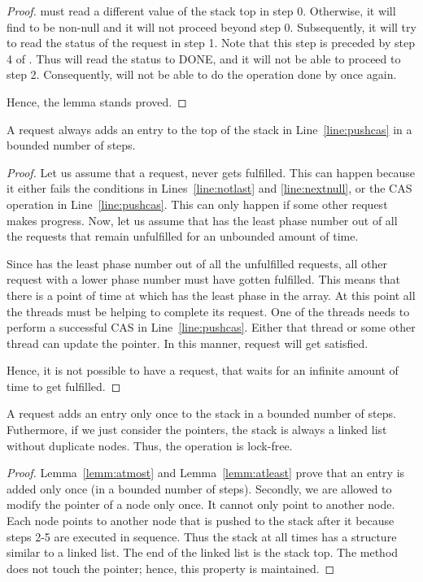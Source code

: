 \documentclass{llncs}
\newcommand{\DONE}{{\scriptsize{DONE}}\xspace}
\begin{document}
\begin{appendix}
\begin{proof}
 must read a different value of the stack top in step 0. Otherwise, it
will find  to be non-null and it will not proceed beyond step 0.
Subsequently, it will try to read the status of the request in step 1.  Note
that this step is preceded by step 4 of . Thus  will read the status
to \DONE, and it will not be able to proceed to step 2. Consequently, 
will not be able to do the  operation done by  once again. 

Hence, the lemma stands proved.
\end{proof}

\begin{lemma}
A  request always adds an entry to the top of the stack in Line~\ref{line:pushcas} in
a bounded number of steps. 
\label{lemm:atleast}
\end{lemma}

\begin{proof}
Let us assume that a  request,  never gets fulfilled. This can
happen because it either fails the  conditions in Lines~\ref{line:notlast} and \ref{line:nextnull}, 
or the CAS operation in Line~\ref{line:pushcas}. This can only happen if some other 
request makes progress. Now, let us assume that  has the least phase
number out of all the  requests that remain unfulfilled for an unbounded
amount of time. 

Since  has the least phase number out of all the unfulfilled requests, all
other request with a lower phase number must have gotten fulfilled. This means
that there is a point of time at which  has the least phase in the 
array. At this point all the threads must be helping  to complete its request.
One of the threads needs to perform a successful CAS in Line~\ref{line:pushcas}. Either that thread
or some other thread can update the  pointer. In this manner, request  will
get satisfied. 

Hence, it is not possible to have a request,  that waits for an infinite amount
of time to get fulfilled. 
\end{proof}

\begin{theorem}
A  request adds an entry only once to the stack in a bounded
number of steps. Futhermore, if we
just consider the  pointers,  the stack 
is always a linked list without duplicate nodes. 
Thus, the  operation is lock-free.
\end{theorem}

\begin{proof}
Lemma~\ref{lemm:atmost} and Lemma~\ref{lemm:atleast} prove that an entry is added
only once (in a bounded number of steps).
Secondly, we are allowed to modify the  pointer of a node only once.
It cannot only point to another node. Each node points to another node that is pushed
to the stack after it because steps 2-5 are executed in sequence. Thus the stack
at all times has a structure similar to a linked list. The end of the linked list
is the stack top. The  method does not touch the  pointer; hence, this
property is maintained.
\end{proof}




\end{appendix}
\end{document}
